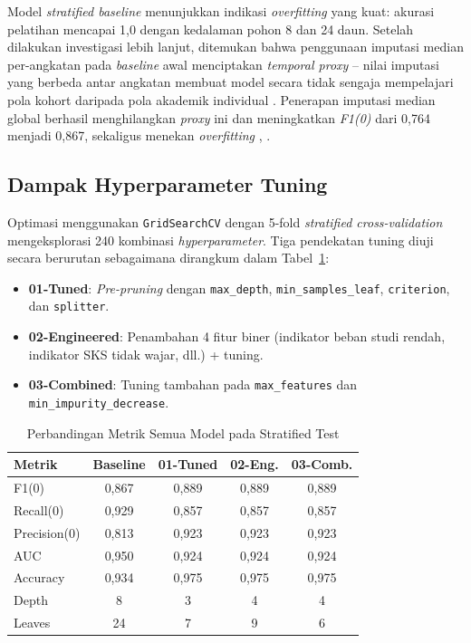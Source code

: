 \documentclass{ieeeaccess}
\begin{document}
Model \emph{stratified baseline} menunjukkan indikasi \emph{overfitting} yang kuat: akurasi pelatihan mencapai 1,0 dengan kedalaman pohon 8 dan 24 daun. Setelah dilakukan investigasi lebih lanjut, ditemukan bahwa penggunaan imputasi median per-angkatan pada \emph{baseline} awal menciptakan \emph{temporal proxy} -- nilai imputasi yang berbeda antar angkatan membuat model secara tidak sengaja mempelajari pola kohort daripada pola akademik individual \cite{ref25}. Penerapan imputasi median global berhasil menghilangkan \emph{proxy} ini dan meningkatkan \emph{F1(0)} dari 0,764 menjadi 0,867, sekaligus menekan \emph{overfitting} \cite{ref14}, \cite{ref23}.

\subsection{Dampak Hyperparameter Tuning}

Optimasi menggunakan \texttt{GridSearchCV} dengan 5-fold \emph{stratified cross-validation} mengeksplorasi 240 kombinasi \emph{hyperparameter}. Tiga pendekatan tuning diuji secara berurutan sebagaimana dirangkum dalam Tabel~\ref{tab:tuning}:

\begin{itemize}
    \item \textbf{01-Tuned}: \emph{Pre-pruning} dengan \texttt{max\_depth}, \texttt{min\_samples\_leaf}, \texttt{criterion}, dan \texttt{splitter}.
    \item \textbf{02-Engineered}: Penambahan 4 fitur biner (indikator beban studi rendah, indikator SKS tidak wajar, dll.) + tuning.
    \item \textbf{03-Combined}: Tuning tambahan pada \texttt{max\_features} dan \texttt{min\_impurity\_decrease}.
\end{itemize}

\begin{table}[t]
\caption{Perbandingan Metrik Semua Model pada Stratified Test}
\label{tab:tuning}
\begin{center}
\small
\begin{tabular}{lcccc}
\hline
\textbf{Metrik} & \textbf{Baseline} & \textbf{01-Tuned} & \textbf{02-Eng.} & \textbf{03-Comb.} \\
\hline
F1(0)           & 0,867 & 0,889 & 0,889 & 0,889 \\
Recall(0)       & 0,929 & 0,857 & 0,857 & 0,857 \\
Precision(0)    & 0,813 & 0,923 & 0,923 & 0,923 \\
AUC             & 0,950 & 0,924 & 0,924 & 0,924 \\
Accuracy        & 0,934 & 0,975 & 0,975 & 0,975 \\
Depth           & 8     & 3     & 4     & 4     \\
Leaves          & 24    & 7     & 9     & 6     \\
\hline
\end{tabular}
\end{center}
\end{table}
\end{document}
